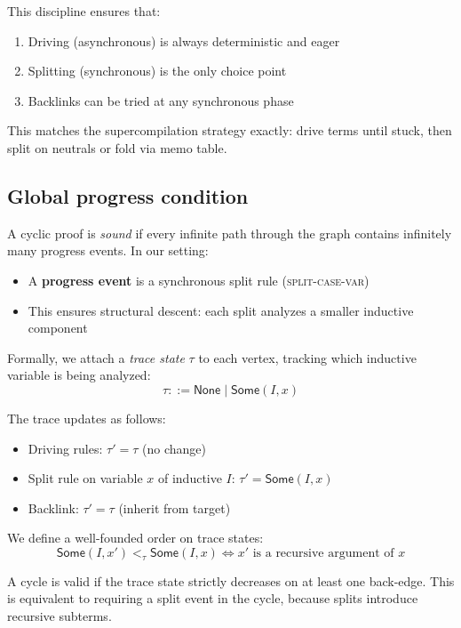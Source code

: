 \noindent This discipline ensures that:
\begin{enumerate}
\item Driving (asynchronous) is always deterministic and eager
\item Splitting (synchronous) is the only choice point
\item Backlinks can be tried at any synchronous phase
\end{enumerate}

\noindent This matches the supercompilation strategy exactly: drive terms until stuck, then split on neutrals or fold via memo table.

\subsection{Global progress condition}
\label{sec:global-condition}

A cyclic proof is \emph{sound} if every infinite path through the graph contains infinitely many progress events. In our setting:
\begin{itemize}
\item A \textbf{progress event} is a synchronous split rule (\textsc{split-case-var})
\item This ensures structural descent: each split analyzes a smaller inductive component
\end{itemize}

\noindent Formally, we attach a \emph{trace state} $\tau$ to each vertex, tracking which inductive variable is being analyzed:
\[
\tau ::= \mathsf{None} \mid \mathsf{Some}(I, x)
\]

\noindent The trace updates as follows:
\begin{itemize}
\item Driving rules: $\tau' = \tau$ (no change)
\item Split rule on variable $x$ of inductive $I$: $\tau' = \mathsf{Some}(I, x)$
\item Backlink: $\tau' = \tau$ (inherit from target)
\end{itemize}

\noindent We define a well-founded order on trace states:
\[
\mathsf{Some}(I, x') <_{\tau} \mathsf{Some}(I, x) \iff x' \text{ is a recursive argument of } x
\]

\noindent A cycle is valid if the trace state strictly decreases on at least one back-edge. This is equivalent to requiring a split event in the cycle, because splits introduce recursive subterms.

